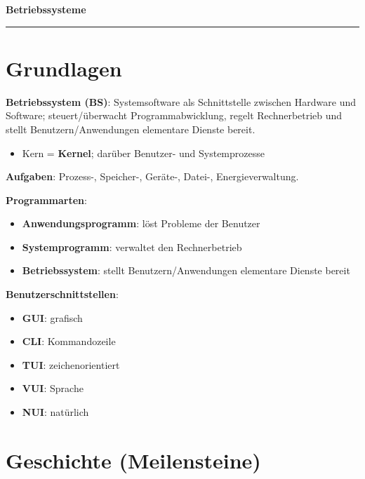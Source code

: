 \documentclass[11pt, a4paper]{article}
\providecommand{\nichttitle}{Lernzettel}
\renewcommand{\nichttitle}{Betriebssysteme}
\begin{document}
\begin{center}
{\bfseries\Large\color{accent}\nichttitle}\\[2pt]
\color{accent}\rule{0.35\linewidth}{1pt}\color{black}
\end{center}
\vspace{2pt}

{\small\tableofcontents}
\newpage


\section{Grundlagen}

\textbf{Betriebssystem (BS)}: Systemsoftware als Schnittstelle zwischen Hardware und Software; steuert/überwacht Programmabwicklung, regelt Rechnerbetrieb und stellt Benutzern/Anwendungen elementare Dienste bereit.

\begin{itemize}
  \item Kern = \textbf{Kernel}; darüber Benutzer- und Systemprozesse
\end{itemize}

\textbf{Aufgaben}: Prozess-, Speicher-, Geräte-, Datei-, Energieverwaltung.


\textbf{Programmarten}:

\begin{itemize}
  \item \textbf{Anwendungsprogramm}: löst Probleme der Benutzer
  \item \textbf{Systemprogramm}: verwaltet den Rechnerbetrieb
  \item \textbf{Betriebssystem}: stellt Benutzern/Anwendungen elementare Dienste bereit
\end{itemize}

\textbf{Benutzerschnittstellen}:

\begin{itemize}
  \item \textbf{GUI}: grafisch
  \item \textbf{CLI}: Kommandozeile
  \item \textbf{TUI}: zeichenorientiert
  \item \textbf{VUI}: Sprache
  \item \textbf{NUI}: natürlich
\end{itemize}


\section{Geschichte (Meilensteine)}
\end{document}
